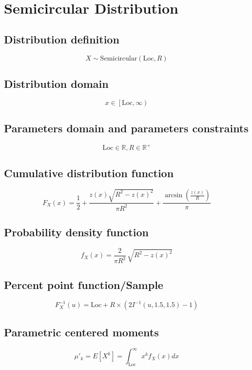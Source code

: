 \documentclass{article}
\begin{document}
\newpage
\section{Semicircular Distribution}
\subsection{Distribution definition}
\begin{equation*} X\sim\mathrm{Semicircular}\left(\text{Loc},R\right) \end{equation*}
\subsection{Distribution domain}
\begin{equation*} x\in\left[\text{Loc},\infty\right) \end{equation*}
\subsection{Parameters domain and parameters constraints}
\begin{equation*} \text{Loc}\in\mathbb{R}, R\in\mathbb{R}^{+} \end{equation*}
\subsection{Cumulative distribution function}
\begin{equation*} F_{X}\left(x\right)=\frac12+\frac{z(x)\sqrt{R^2-z(x)^2}}{\pi R^2}+\frac{\arcsin\!\left(\frac{z(x)}{R}\right)}{\pi} \end{equation*}
\subsection{Probability density function}
\begin{equation*} f_{X}\left(x\right)=\frac2{\pi R^2}\,\sqrt{R^2-z(x)^2} \end{equation*}
\subsection{Percent point function/Sample}
\begin{equation*} F^{-1}_{X}\left(u\right)=\text{Loc}+R\times (2I^{-1}\left(u,1.5,1.5\right)-1) \end{equation*}
\subsection{Parametric centered moments}
\begin{equation*} \mu'_{k}=E[X^k]=\int_{\text{Loc}}^{\infty }x^{k}f_{X}\left(x\right)dx \end{equation*}
\end{document}
